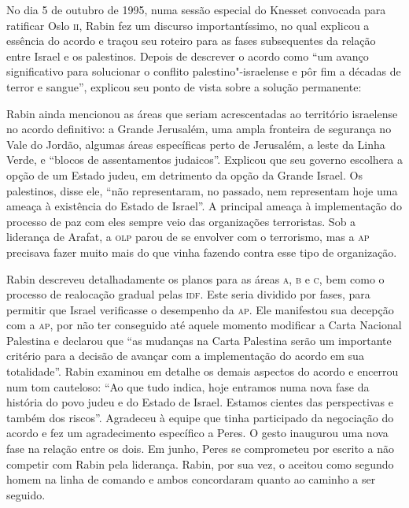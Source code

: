 No dia 5 de outubro de 1995, numa sessão especial do Knesset convocada
para ratificar Oslo \textsc{ii}, Rabin fez um discurso importantíssimo, no qual
explicou a essência do acordo e traçou seu roteiro para as fases
subsequentes da relação entre Israel e os palestinos. Depois de
descrever o acordo como ``um avanço significativo para solucionar o
conflito palestino"-israelense e pôr fim a décadas de terror e sangue'',
explicou seu ponto de vista sobre a solução permanente:

\begin{quote}
\end{quote}

Rabin ainda mencionou as áreas que seriam acrescentadas ao território
israelense no acordo definitivo: a Grande Jerusalém, uma ampla fronteira
de segurança no Vale do Jordão, algumas áreas específicas perto de
Jerusalém, a leste da Linha Verde, e ``blocos de assentamentos
judaicos''. Explicou que seu governo escolhera a opção de um Estado
judeu, em detrimento da opção da Grande Israel. Os palestinos, disse
ele, ``não representaram, no passado, nem representam hoje uma ameaça à
existência do Estado de Israel''. A principal ameaça à implementação do
processo de paz com eles sempre veio das organizações terroristas. Sob a
liderança de Arafat, a \textsc{olp} parou de se envolver com o terrorismo, mas a
\textsc{ap} precisava fazer muito mais do que vinha fazendo contra esse tipo de
organização.

Rabin descreveu detalhadamente os planos 
para as áreas \textsc{a}, \textsc{b} e \textsc{c}, bem
como o processo de realocação gradual pelas \textsc{idf}. Este seria
dividido por fases, para permitir que Israel verificasse o desempenho da
\textsc{ap}. Ele manifestou sua decepção com a \textsc{ap}, por não ter conseguido até
aquele momento modificar a Carta Nacional Palestina e declarou que ``as
mudanças na Carta Palestina serão um importante critério para a decisão
de avançar com a implementação do acordo em sua totalidade''. Rabin
examinou em detalhe os demais aspectos do acordo e encerrou num tom
cauteloso: ``Ao que tudo indica, hoje entramos numa nova fase da
história do povo judeu e do Estado de Israel. Estamos cientes das
perspectivas e também dos riscos''. Agradeceu à equipe que tinha
participado da negociação do acordo e fez um agradecimento específico a
Peres. O gesto inaugurou uma nova fase na relação entre os dois. Em
junho, Peres se comprometeu por escrito a não competir com Rabin pela
liderança. Rabin, por sua vez, o aceitou como segundo homem na linha de
comando e ambos concordaram quanto ao caminho a ser seguido.

